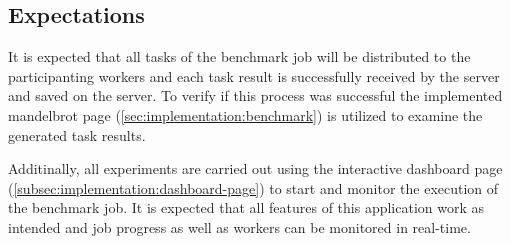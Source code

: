 \subsection{Expectations}
It is expected that all tasks of the benchmark job will be distributed to the participanting workers and each task result is successfully received by the server and saved on the server. To verify if this process was successful the implemented mandelbrot page (\autoref{sec:implementation:benchmark}) is utilized to examine the generated task results.

Additinally, all experiments are carried out using the interactive dashboard page (\autoref{subsec:implementation:dashboard-page}) to start and monitor the execution of the benchmark job. It is expected that all features of this application work as intended and job progress as well as workers can be monitored in real-time.


